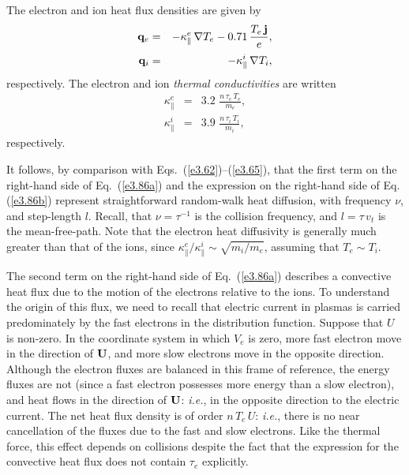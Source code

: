 The electron and ion heat flux densities are given by
\begin{eqnarray}\label{e3.86a}
{\bf q}_e &=& -\kappa_\parallel^e\,\nabla T_e - 
0.71\,\frac{T_e\,{\bf j}}{e},\\[0.5ex]
{\bf q}_i &=& -\kappa_\parallel^i\,\nabla T_i,\label{e3.86b}
\end{eqnarray}
respectively. The electron and ion {\em thermal conductivities}\/ are written
\begin{eqnarray}\label{e3.87a}
\kappa_\parallel^e &=& 3.2\,\,\frac{n\,\tau_e\,T_e}{m_e},\\[0.5ex]
\kappa_\parallel^i &=& 3.9\,\,\frac{n\,\tau_i\,T_i}{m_i},\label{e3.87b}
\end{eqnarray}
respectively. 

It follows, by comparison with Eqs.~(\ref{e3.62})--(\ref{e3.65}), that 
the first term on the right-hand side of Eq.~(\ref{e3.86a}) and the expression
on the right-hand side of Eq. (\ref{e3.86b}) represent straightforward
random-walk heat diffusion, with frequency $\nu$, and step-length $l$.
Recall, that $\nu=\tau^{-1}$ is the collision frequency, and
$l=\tau\,v_t$ is the mean-free-path. Note  that the
electron  heat diffusivity is generally much greater than that of the ions,
since $\kappa_\parallel^e/\kappa_\parallel^i\sim \sqrt{m_i/m_e}$,
assuming that $T_e\sim T_i$. 

The second term on the right-hand side of Eq.~(\ref{e3.86a}) describes  a convective
heat flux due to the motion of the electrons relative to the ions. 
To understand the origin of this flux, we need to recall that
electric current in plasmas is carried predominately by the fast electrons
in the distribution function. Suppose that $U$ is non-zero. In the
coordinate system in which $V_e$ is zero, more fast electron move in the
direction of ${\bf U}$, and more slow electrons move in the opposite
direction. Although the electron fluxes are balanced in this frame of reference,
the energy fluxes are not (since a fast electron possesses more energy than a slow
electron), and heat flows in the direction of ${\bf U}$: {\em i.e.}, in
the opposite direction to the electric current. The net heat flux density is of
order $n\,T_e\,U$: {\em i.e.}, there is no near cancellation of the fluxes
due to the fast and slow electrons. Like the thermal force, this effect
depends on collisions despite the fact that the expression for the convective
heat flux does not contain $\tau_e$ explicitly. 

